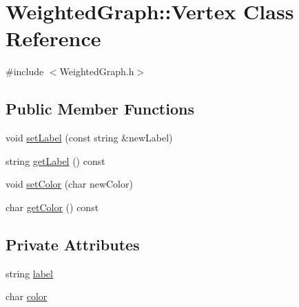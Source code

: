 \hypertarget{class_weighted_graph_1_1_vertex}{\section{\-Weighted\-Graph\-:\-:\-Vertex \-Class \-Reference}
\label{class_weighted_graph_1_1_vertex}
}


{\ttfamily \#include $<$\-Weighted\-Graph.\-h$>$}

\subsection*{\-Public \-Member \-Functions}
\begin{DoxyCompactItemize}
\item 
void \hyperlink{class_weighted_graph_1_1_vertex_afeacbff508350a8d2142369cc0ee09ba}{set\-Label} (const string \&new\-Label)
\item 
string \hyperlink{class_weighted_graph_1_1_vertex_a09bc4b28b77ed88f70df2438eecb1990}{get\-Label} () const 
\item 
void \hyperlink{class_weighted_graph_1_1_vertex_ac4fcd685324729f5956640cad824caad}{set\-Color} (char new\-Color)
\item 
char \hyperlink{class_weighted_graph_1_1_vertex_a4b10c5c1a23bc100385c33b9a40a65eb}{get\-Color} () const 
\end{DoxyCompactItemize}
\subsection*{\-Private \-Attributes}
\begin{DoxyCompactItemize}
\item 
string \hyperlink{class_weighted_graph_1_1_vertex_a9653450774bc621cac91b9a403f4062e}{label}
\item 
char \hyperlink{class_weighted_graph_1_1_vertex_a56942930088e9bdf0d8a79138ccc679c}{color}
\end{DoxyCompactItemize}


